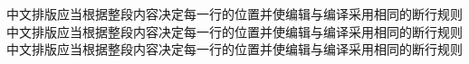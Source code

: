 \documentclass{article}
\begin{document}
中文排版应当根据整段内容决定每一行的位置并使编辑与编译采用相同的断行规则中文排版应当根据整段内容决定每一行的位置并使编辑与编译采用相同的断行规则中文排版应当根据整段内容决定每一行的位置并使编辑与编译采用相同的断行规则
\end{document}
